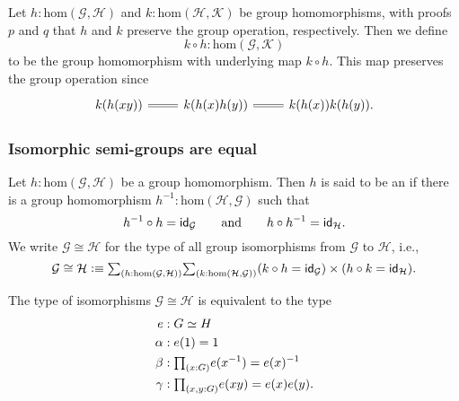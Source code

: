 \begin{defn}
Let $h:\mathrm{hom}(\mathcal{G},\mathcal{H})$ and $k:\mathrm{hom}(\mathcal{H},\mathcal{K})$ be group homomorphisms, with proofs $p$ and $q$ that $h$ and $k$ preserve the group operation, respectively. Then we define
\begin{equation*}
k\circ h:\mathrm{hom}(\mathcal{G},\mathcal{K})
\end{equation*}
to be the group homomorphism with underlying map $k\circ h$. This map preserves the group operation since
\begin{equation*}
\begin{tikzcd}
k(h(xy)) \arrow[r,equals] & k(h(x)h(y)) \arrow[r,equals] & k(h(x))k(h(y)).
\end{tikzcd}
\end{equation*}
\end{defn}

\subsubsection{Isomorphic semi-groups are equal}

\begin{defn}
Let $h:\mathrm{hom}(\mathcal{G},\mathcal{H})$ be a group homomorphism. Then $h$ is said to be an  if there is a group homomorphism $h^{-1}:\mathrm{hom}(\mathcal{H},\mathcal{G})$ such that
\begin{equation*}
h^{-1}\circ h=\idfunc[\mathcal{G}]\qquad\text{and}\qquad h\circ h^{-1}=\idfunc[\mathcal{H}].
\end{equation*}
We write $\mathcal{G}\cong\mathcal{H}$ for the type of all group isomorphisms from $\mathcal{G}$ to $\mathcal{H}$, i.e.,
\begin{equation*}
\mathcal{G}\cong\mathcal{H} \defeq \sm{h:\mathrm{hom}(\mathcal{G},\mathcal{H})}{k:\mathrm{hom}(\mathcal{H},\mathcal{G})} (k\circ h = \idfunc[\mathcal{G}])\times (h\circ k=\idfunc[\mathcal{H}]).
\end{equation*}
\end{defn}

\begin{lem}\label{lem:grp_iso}
The type of isomorphisms $\mathcal{G}\cong\mathcal{H}$ is equivalent to the type
\begin{align*}
e & : \eqv{G}{H} \\
\alpha & : e(1)=1 \\
\beta & : \prd{x:G}e(x^{-1})=e(x)^{-1} \\
\gamma & : \prd{x,y:G} e(xy)=e(x)e(y).
\end{align*}
\end{lem}


